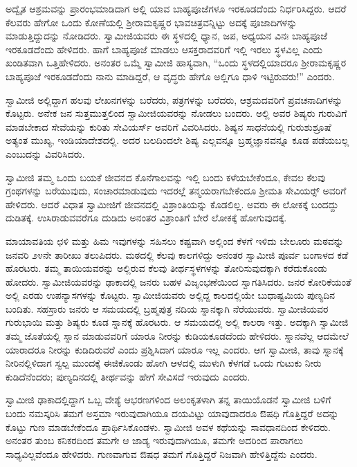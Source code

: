  ಅದ್ವೈತ ಆಶ್ರಮವನ್ನು ಪ್ರಾರಂಭಮಾಡಿದಾಗ ಅಲ್ಲಿ ಯಾವ ಬಾಹ್ಯಪೂಜೆಗಳೂ ಇರಕೂಡದೆಂದು ನಿರ್ಧರಿಸಿದ್ದರು. ಆದರೆ ಕೆಲವರು ಹೇಗೋ ಒಂದು ಕೋಣೆಯಲ್ಲಿ ಶ‍್ರೀರಾಮಕೃಷ್ಣರ ಭಾವಚಿತ್ರವನ್ನಿಟ್ಟು ಅದಕ್ಕೆ ಪೂಜಾದಿಗಳನ್ನು ಮಾಡುತ್ತಿದ್ದುದನ್ನು ನೋಡಿದರು. ಸ್ವಾಮೀಜಿಯವರು ಈ ಸ್ಥಳದಲ್ಲಿ ಧ್ಯಾನ, ಜಪ, ಅಧ್ಯಯನ ವಿನಃ ಬಾಹ್ಯಪೂಜೆ ಇರಕೂಡದೆಂದು ಹೇಳಿದರು. ಹಾಗೆ ಬಾಹ್ಯಪೂಜೆ ಮಾಡಲು ಆಸಕ್ತರಾದವರಿಗೆ ಇಲ್ಲಿ ಇರಲು ಸ್ಥಳವಿಲ್ಲ ಎಂದು ಖಂಡಿತವಾಗಿ ಒತ್ತಿಹೇಳಿದರು. ಅನಂತರ ಒಮ್ಮೆ ಸ್ವಾಮೀಜಿ ಹಾಸ್ಯವಾಗಿ, “ಒಂದು ಸ್ಥಳದಲ್ಲಿಯಾದರೂ ಶ‍್ರೀರಾಮಕೃಷ್ಣರ ಬಾಹ್ಯಪೂಜೆ ಇರಕೂಡದೆಂದು ನಾನು ಮಾಡಿದ್ದರೆ, ಆ ವೃದ್ಧರು ಹೇಗೊ ಅಲ್ಲಿಗೂ ಧಾಳಿ ಇಟ್ಟಿರುವರು!” ಎಂದರು. 

 ಸ್ವಾಮೀಜಿ ಅಲ್ಲಿದ್ದಾಗ ಹಲವು ಲೇಖನಗಳನ್ನು ಬರೆದರು, ಪತ್ರಗಳನ್ನು ಬರೆದರು, ಆಶ್ರಮದವರಿಗೆ ಪ್ರವಚನಾದಿಗಳನ್ನು ಕೊಟ್ಟರು. ಅನೇಕ ಜನ ಸುತ್ತಮುತ್ತಲಿಂದ ಸ್ವಾಮೀಜಿಯವರನ್ನು ನೋಡಲು ಬಂದರು. ಅಲ್ಲಿ ಅವರ ಶಿಷ್ಯರು ಗುರುವಿಗೆ ಮಾಡಬೇಕಾದ ಸೇವೆಯನ್ನು ಕುರಿತು ಸೇವಿಯರ್ಸ್ ಅವರಿಗೆ ವಿವರಿಸಿದರು. ಶಿಷ್ಯನ ಸಾಧನೆಯಲ್ಲಿ ಗುರುಶುಶ್ರೂಷೆ ಅತ್ಯಂತ ಮುಖ್ಯ, ಇಂಡಿಯಾದೇಶದಲ್ಲಿ. ಅದರ ಬಲದಿಂದಲೇ ಶಿಷ್ಯ ಎಲ್ಲವನ್ನೂ ಬ್ರಹ್ಮಜ್ಞಾನವನ್ನೂ ಕೂಡ ಪಡೆಯಬಲ್ಲ ಎಂಬುದನ್ನು ವಿವರಿಸಿದರು. 

 ಸ್ವಾಮೀಜಿ ತಮ್ಮ ಒಂದು ಬಯಕೆ ಜೀವನದ ಕೊನೆಗಾಲವನ್ನು ಇಲ್ಲಿ ಬಂದು ಕಳೆಯಬೇಕೆಂದೂ, ಕೇವಲ ಕೆಲವು ಗ್ರಂಥಗಳನ್ನು ಬರೆಯುವುದು, ಸಂಚಾರಮಾಡುವುದು ಇದರಲ್ಲೆ ತನ್ಮಯರಾಗಬೇಕೆಂದೂ ಶ‍್ರೀಮತಿ ಸೇವಿಯರ್ಸ್‍‍ ಅವರಿಗೆ ಹೇಳಿದರು. ಆದರೆ ವಿಧಾತ ಸ್ವಾಮೀಜಿಗೆ ಜೀವನದಲ್ಲಿ ವಿಶ್ರಾಂತಿಯನ್ನು ಕೊಡಲಿಲ್ಲ. ಅವರು ಈ ಲೋಕಕ್ಕೆ ಬಂದದ್ದು ದುಡಿತಕ್ಕೆ. ಉಸಿರಾಡುವವರೆಗೂ ದುಡಿದು ಅನಂತರ ವಿಶ್ರಾಂತಿಗೆ ಬೇರೆ ಲೋಕಕ್ಕೆ ಹೋಗುವುದಕ್ಕೆ. 

 ಮಾಯಾವತಿಯ ಛಳಿ ಮತ್ತು ಹಿಮ ಇವುಗಳನ್ನು ಸಹಿಸಲು ಕಷ್ಟವಾಗಿ ಅಲ್ಲಿಂದ ಕೆಳಗೆ ಇಳಿದು ಬೇಲೂರು ಮಠವನ್ನು ಜನವರಿ ೨೪ನೇ ತಾರೀಖು ತಲುಪಿದರು. ಮಠದಲ್ಲಿ ಕೆಲವು ಕಾಲಗಳಿದ್ದು ಅನಂತರ ಸ್ವಾಮೀಜಿ ಪೂರ್ವ ಬಂಗಾಳದ ಕಡೆ ಹೊರಟರು. ತಮ್ಮ ತಾಯಿಯವರನ್ನು ಅಲ್ಲಿರುವ ಕೆಲವು ತೀರ್ಥಸ್ಥಳಗಳನ್ನು ತೋರಿಸುವುದಕ್ಕಾಗಿ ಕರೆದುಕೊಂಡು ಹೋದರು. ಸ್ವಾಮೀಜಿಯವರನ್ನು ಢಾಕಾದಲ್ಲಿ ಜನರು ಬಹಳ ವಿಜೃಂಭಣೆಯಿಂದ ಸ್ವಾಗತಿಸಿದರು. ಜನರ ಕೋರಿಕೆಯಂತೆ ಅಲ್ಲಿ ಎರಡು ಉಪನ್ಯಾಸಗಳನ್ನು ಕೊಟ್ಟರು. ಸ್ವಾಮೀಜಿಯವರು ಅಲ್ಲಿದ್ದ ಕಾಲದಲ್ಲಿಯೇ ಬುಧಾಷ್ಟಮಿಯ ಪುಣ್ಯದಿನ ಬಂದಿತು. ಸಹಸ್ರಾರು ಜನರು ಆ ಸಮಯದಲ್ಲಿ ಬ್ರಹ್ಮಪುತ್ರ ನದಿಯ ಸ್ನಾನಕ್ಕಾಗಿ ನೆರೆಯುವರು. ಸ್ವಾಮೀಜಿಯವರ ಗುರುಭಾಯಿ ಮತ್ತು ಶಿಷ್ಯರು ಕೂಡ ಸ್ನಾನಕ್ಕೆ ಹೊರಟರು. ಆ ಸಮಯದಲ್ಲಿ ಅಲ್ಲಿ ಕಾಲರಾ ಇತ್ತು. ಅದಕ್ಕಾಗಿ ಸ್ವಾಮೀಜಿ ತಮ್ಮ ಜೊತೆಯಲ್ಲಿ ಸ್ನಾನ ಮಾಡುವವರಿಗೆ ಯಾರೂ ನೀರನ್ನು ಕುಡಿಯಕೂಡದೆಂದು ಹೇಳಿದರು. ಸ್ನಾನವೆಲ್ಲ ಆದಮೇಲೆ ಯಾರಾದರೂ ನೀರನ್ನು ಕುಡಿದಿರುವರೆ ಎಂದು ಪ್ರಶ್ನಿಸಿದಾಗ ಯಾರೂ ಇಲ್ಲ ಎಂದರು. ಆಗ ಸ್ವಾಮೀಜಿ, ತಾವು ಸ್ನಾನಕ್ಕೆ ನೀರಿನಲ್ಲಿಳಿದಾಗ ಸ್ವಲ್ಪ ಮುಂದಕ್ಕೆ ಈಜಿಕೊಂಡು ಹೋಗಿ ಆಳದಲ್ಲಿ ಮುಳುಗಿ ಕೆಳಗಡೆ ಒಂದು ಗುಟುಕು ನೀರು ಕುಡಿದೆನೆಂದರು; ಪುಣ್ಯದಿನದಲ್ಲಿ ತೀರ್ಥವನ್ನು ಹೇಗೆ ಸೇವಿಸದೆ ಇರುವುದು ಎಂದರು. 

 ಸ್ವಾಮೀಜಿ ಢಾಕಾದಲ್ಲಿದ್ದಾಗ ಒಬ್ಬ ವೇಶ್ಯೆ ಆಭರಣಗಳಿಂದ ಅಲಂಕೃತಳಾಗಿ ತನ್ನ ತಾಯಿಯೊಡನೆ ಸ್ವಾಮೀಜಿ ಬಳಿಗೆ ಬಂದು ನಮಸ್ಕರಿಸಿ ತಮಗೆ ಅಸ್ತಮಾ ಇರುವುದಾಗಿಯೂ ದಯವಿಟ್ಟು ಯಾವುದಾದರೂ ಔಷಧಿ ಗೊತ್ತಿದ್ದರೆ ಅದನ್ನು ಕೊಟ್ಟು ಗುಣ ಮಾಡಬೇಕೆಂದೂ‌ ಪ್ರಾರ್ಥಿಸಿಕೊಂಡಳು. ಸ್ವಾಮೀಜಿ ಅವಳ ಕಥೆಯನ್ನು ಸಾವಧಾನದಿಂದ ಕೇಳಿದರು. ಅನಂತರ ತುಂಬ ಕನಿಕರದಿಂದ ತಮಗೇ ಆ ಜಾಡ್ಯ ಇರುವುದಾಗಿಯೂ, ತಮಗೇ ಅದರಿಂದ ಪಾರಾಗಲು ಸಾಧ್ಯವಿಲ್ಲವೆಂದೂ ಹೇಳಿದರು. ಗುಣವಾಗುವ ಔಷಧ ತಮಗೆ ಗೊತ್ತಿದ್ದರೆ ನಿಜವಾಗಿ ಹೇಳಿತ್ತಿದ್ದೆನು ಎಂದರು. 

